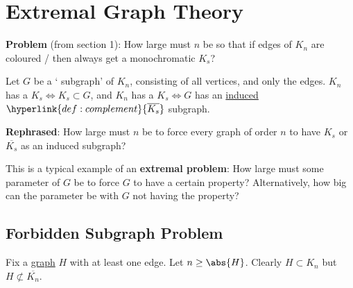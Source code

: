 \documentclass{article}
\begin{document}

\clearpage
\section{Extremal Graph Theory}

\textbf{Problem} (from section 1): How large must $n$ be so that if edges of \hyperlink{def:Kn}{$K_n$} are coloured / then always get a monochromatic $K_s$?

Let $G$ be a ` subgraph' of $K_n$, consisting of all vertices, and only the  edges.
$K_n$ has a  $K_s \iff K_s \subset G$, and $K_n$ has a  $K_s \iff G$ has an \hyperlink{def:indSubgraph}{induced} $\hyperlink{def:complement}{\overline{K_s}}$ subgraph.

\textbf{Rephrased}:
How large must $n$ be to force every graph of order $n$ to have $K_s$ or $\overline{K_s}$ as an induced subgraph?

This is a typical example of an \textbf{extremal problem}: How large must some parameter of $G$ be to force $G$ to have a certain property?
Alternatively, how big can the parameter be with $G$ not having the property?

\subsection{Forbidden Subgraph Problem}
Fix a \hyperlink{def:graph}{graph} $H$ with at least one edge. Let $n \geq \abs{H}$. Clearly $H \subset K_n$ but $H \not\subset \overline{K_n}$.
\end{document}
